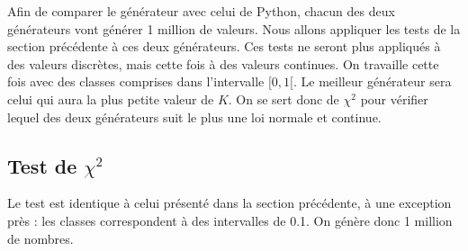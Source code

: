\documentclass[10pt,a4paper]{article}
\begin{document}
Afin de comparer le générateur avec celui de Python, chacun des deux générateurs vont générer 1 million de valeurs. Nous allons appliquer les tests de la section précédente à ces deux générateurs. Ces tests ne seront plus appliqués à des valeurs discrètes, mais cette fois à des valeurs continues. On travaille cette fois avec des classes comprises dans l'intervalle $[0, 1[$. Le meilleur générateur sera celui qui aura la plus petite valeur de $K$. On se sert donc de $\chi^2$ pour vérifier lequel des deux générateurs suit le plus une loi normale et continue.

\subsection{Test de $\chi^2$}

Le test est identique à celui présenté dans la section précédente, à une exception près : les classes correspondent à des intervalles de 0.1. On génère donc 1 million de nombres.

\begin{figure}[H]
\label{couponshisto}
\end{figure}

\end{document}
